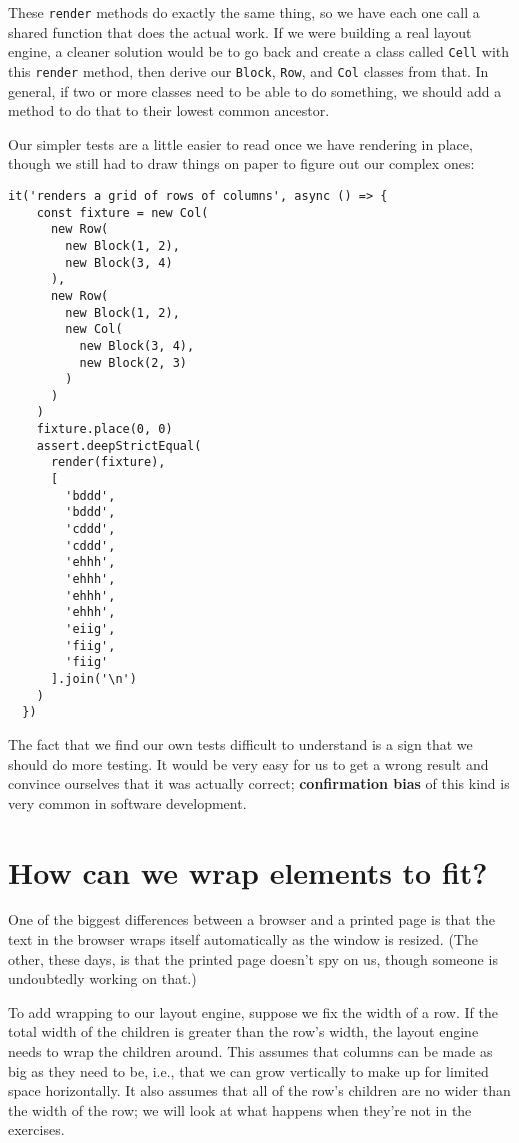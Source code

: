 \documentclass[krantzl]{krantz}
\newcommand{\glossref}[1]{\textbf{#1}}
\begin{document}
\noindent These \texttt{render} methods do exactly the same thing,
so we have each one call a shared function that does the actual work.
If we were building a real layout engine,
a cleaner solution would be to go back and create a class called \texttt{Cell} with this \texttt{render} method,
then derive our \texttt{Block}, \texttt{Row}, and \texttt{Col} classes from that.
In general,
if two or more classes need to be able to do something,
we should add a method to do that to their lowest common ancestor.


Our simpler tests are a little easier to read once we have rendering in place,
though we still had to draw things on paper to figure out our complex ones:


\begin{lstlisting}[frame=single,frameround=tttt]
  it('renders a grid of rows of columns', async () => {
    const fixture = new Col(
      new Row(
        new Block(1, 2),
        new Block(3, 4)
      ),
      new Row(
        new Block(1, 2),
        new Col(
          new Block(3, 4),
          new Block(2, 3)
        )
      )
    )
    fixture.place(0, 0)
    assert.deepStrictEqual(
      render(fixture),
      [
        'bddd',
        'bddd',
        'cddd',
        'cddd',
        'ehhh',
        'ehhh',
        'ehhh',
        'ehhh',
        'eiig',
        'fiig',
        'fiig'
      ].join('\n')
    )
  })
\end{lstlisting}



\noindent The fact that we find our own tests difficult to understand
is a sign that we should do more testing.
It would be very easy for us to get a wrong result
and convince ourselves that it was actually correct;
\glossref{confirmation bias} of this kind
is very common in software development.

\section{How can we wrap elements to fit?}\label{layout-engine-fit}


One of the biggest differences between a browser and a printed page
is that the text in the browser wraps itself automatically as the window is resized.
(The other, these days, is that the printed page doesn't spy on us,
though someone is undoubtedly working on that.)


To add wrapping to our layout engine,
suppose we fix the width of a row.
If the total width of the children is greater than the row's width,
the layout engine needs to wrap the children around.
This assumes that columns can be made as big as they need to be,
i.e.,
that we can grow vertically to make up for limited space horizontally.
It also assumes that all of the row's children are no wider than the width of the row;
we will look at what happens when they're not in the exercises.
\end{document}
